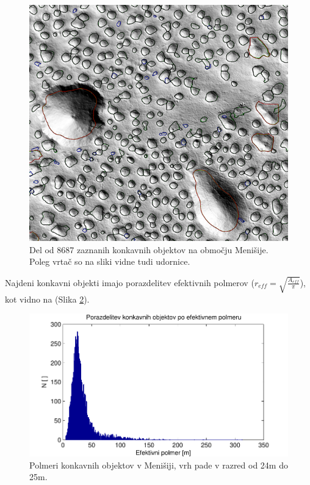 \documentclass[a4paper, oneside, 12pt]{book}
\begin{document}
        \begin{figure}[H]
          \begin{center}
            \includegraphics[width=13cm]{slike/menisija-vrtace}
          \end{center}
          \caption{Del od 8687 zaznanih konkavnih objektov na območju Menišije. Poleg vrtač so na sliki vidne tudi udornice.}
          \label{fig:menisija-vrtace}
        \end{figure}

        Najdeni konkavni objekti imajo porazdelitev efektivnih polmerov (\mbox{$r_{eff}=\sqrt{\frac{A_{eff}}{\pi}}$}), kot vidno na (Slika \ref{fig:menisija-polmeri-hist}).

        \begin{figure}[H]
          \centering
          \includegraphics{slike/menisija-polmeri-hist}
          \caption{Polmeri konkavnih objektov v Menišiji, vrh pade v razred od 24m do 25m.}
          \label{fig:menisija-polmeri-hist}
        \end{figure}
\end{document}
